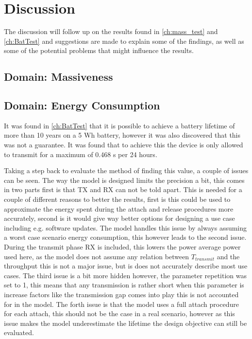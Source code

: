 \chapter{Discussion}
The discussion will follow up on the results found in \autoref{ch:mass_test} and \autoref{ch:BatTest} and suggestions are made to explain some of the findings, as well as some of the potential problems that might influence the results. 

\section{Domain: Massiveness}


\section{Domain: Energy Consumption}
It was found in \autoref{ch:BatTest} that it is possible to achieve a battery lifetime of more than 10 years on a 5 Wh battery, however it was also discovered that this was not a guarantee. It was found that to achieve this the device is only allowed to transmit for a maximum of 0.468 s per 24 hours. 

Taking a step back to evaluate the method of finding this value, a couple of issues can be seen. The way the model is designed limits the precision a bit, this comes in two parts first is that TX and RX can not be told apart. This is needed for a couple of different reasons to better the results, first is this could be used to approximate the energy spent during the attach and release procedures more accurately, second is it would give way better options for designing a use case including e.g. software updates. The model handles this issue by always assuming a worst case scenario energy consumption, this however leads to the second issue. During the transmit phase RX is included, this lowers the power average power used here, as the model does not assume any relation between $T_{transmit}$ and the throughput this is not a major issue, but is does not accurately describe most use cases. The third issue is a bit more hidden however, the parameter repetition was set to 1, this means that any transmission is rather short when this parameter is increase factors like the transmission gap comes into play this is not accounted for in the model. The forth issue is that the model uses a full attach procedure for each attach, this should not be the case in a real scenario, however as this issue makes the model underestimate the lifetime the design objective can still be evaluated.

